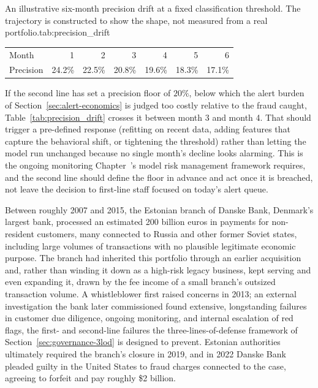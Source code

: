 \documentclass[../ai_in_finance]{subfiles}
\begin{document}
\begin{booktable}{An illustrative six-month precision drift at a fixed classification threshold. The trajectory is constructed to show the shape, not measured from a real portfolio.}{tab:precision_drift}
\begin{tabular}{lrrrrrr}
\toprule
Month & 1 & 2 & 3 & 4 & 5 & 6 \\
Precision & 24.2\% & 22.5\% & 20.8\% & 19.6\% & 18.3\% & 17.1\% \\
\bottomrule
\end{tabular}
\end{booktable}

If the second line has set a precision floor of $20\%$, below which the alert burden of Section~\ref{sec:alert-economics} is judged too costly relative to the fraud caught, Table~\ref{tab:precision_drift} crosses it between month 3 and month 4. That should trigger a pre-defined response (refitting on recent data, adding features that capture the behavioral shift, or tightening the threshold) rather than letting the model run unchanged because no single month's decline looks alarming. This is the ongoing monitoring Chapter~'s model risk management framework requires, and the second line should define the floor in advance and act once it is breached, not leave the decision to first-line staff focused on today's alert queue.


Between roughly 2007 and 2015, the Estonian branch of Danske Bank, Denmark's largest bank, processed an estimated 200 billion euros in payments for non-resident customers, many connected to Russia and other former Soviet states, including large volumes of transactions with no plausible legitimate economic purpose. The branch had inherited this portfolio through an earlier acquisition and, rather than winding it down as a high-risk legacy business, kept serving and even expanding it, drawn by the fee income of a small branch's outsized transaction volume. A whistleblower first raised concerns in 2013; an external investigation the bank later commissioned found extensive, longstanding failures in customer due diligence, ongoing monitoring, and internal escalation of red flags, the first- and second-line failures the three-lines-of-defense framework of Section~\ref{sec:governance-3lod} is designed to prevent. Estonian authorities ultimately required the branch's closure in 2019, and in 2022 Danske Bank pleaded guilty in the United States to fraud charges connected to the case, agreeing to forfeit and pay roughly \$2 billion.
\end{document}
